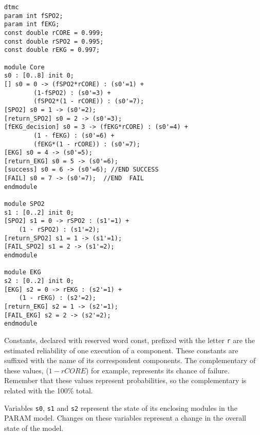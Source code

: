 \documentclass[conference]{IEEEtran}
\begin{document}
\begin{lstlisting}[language=prism, label=lst:model,caption=PARAM model]
dtmc
param int fSPO2;
param int fEKG;
const double rCORE = 0.999;
const double rSPO2 = 0.995;
const double rEKG = 0.997;

module Core
s0 : [0..8] init 0;
[] s0 = 0 -> (fSPO2*rCORE) : (s0'=1) + 
		(1-fSPO2) : (s0'=3) + 
		(fSPO2*(1 - rCORE)) : (s0'=7);
[SPO2] s0 = 1 -> (s0'=2);
[return_SPO2] s0 = 2 -> (s0'=3);
[fEKG_decision] s0 = 3 -> (fEKG*rCORE) : (s0'=4) +
		(1 - fEKG) : (s0'=6) +
		(fEKG*(1 - rCORE)) : (s0'=7);
[EKG] s0 = 4 -> (s0'=5);
[return_EKG] s0 = 5 -> (s0'=6); 
[success] s0 = 6 -> (s0'=6); //END SUCCESS
[FAIL] s0 = 7 -> (s0'=7);  //END  FAIL
endmodule

module SPO2
s1 : [0..2] init 0;
[SPO2] s1 = 0 -> rSPO2 : (s1'=1) + 
	(1 - rSPO2) : (s1'=2);
[return_SPO2] s1 = 1 -> (s1'=1);
[FAIL_SPO2] s1 = 2 -> (s1'=2);
endmodule

module EKG
s2 : [0..2] init 0;
[EKG] s2 = 0 -> rEKG : (s2'=1) + 
	(1 - rEKG) : (s2'=2);
[return_EKG] s2 = 1 -> (s2'=1);
[FAIL_EKG] s2 = 2 -> (s2'=2);
endmodule
\end{lstlisting}	

	 Constants, declared with reserved word {\color{purple} const},
	 prefixed with the letter \texttt{r} are the estimated reliability
	 of one execution of a component. These constants are suffixed 
	 with the name of its correspondent components. The complementary of these values, 
	 ($1 - rCORE$) for example, represents its chance of failure. Remember
	 that these values represent probabilities, so the complementary is related
	 with the 100\% total.
	
	Variables \texttt{s0}, \texttt{s1} and \texttt{s2} represent the state of its 
	enclosing modules in the PARAM model. Changes on these variables
	represent a change in the overall state of the model.
	 
\end{document}
